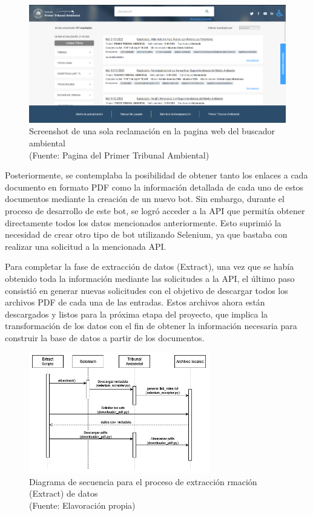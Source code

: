 \begin{figure}[ht!]
    \centering
    \includegraphics[width=.8\textwidth]{figures/huemul2.png}
    \caption[Screenshot de una sola reclamación en la pagina web del buscador ambiental]{Screenshot de una sola reclamación en la pagina web del buscador ambiental\\
    {\scriptsize (Fuente: Pagina del Primer Tribunal Ambiental)}}
    \label{fig:extract2}
\end{figure}
    
Posteriormente, se contemplaba la posibilidad de obtener tanto los enlaces a cada documento en formato PDF como la información 
detallada de cada uno de estos documentos mediante la creación de un nuevo bot. Sin embargo, durante el proceso de desarrollo 
de este bot, se logró acceder a la API que permitía obtener directamente todos los datos mencionados anteriormente. Esto suprimió 
la necesidad de crear otro tipo de bot utilizando Selenium, ya que bastaba con realizar una solicitud a la mencionada API.

Para completar la fase de extracción de datos (Extract), una vez que se había obtenido toda la información mediante las solicitudes 
a la API, el último paso consistió en generar nuevas solicitudes con el objetivo de descargar todos los archivos PDF de cada una 
de las entradas. Estos archivos ahora están descargados y listos para la próxima etapa del proyecto, que implica la transformación 
de los datos con el fin de obtener la información necesaria para construir la base de datos a partir de los documentos.

\begin{figure}[ht!]
    \centering
    \includegraphics[width=0.7\textwidth]{figures/extract_diagram.png}
    \caption[Diagrama de secuencia para el proceso de extracción rmación (Extract) de datos]{Diagrama de secuencia para el proceso de extracción rmación (Extract) de datos\\
    {\scriptsize (Fuente: Elavoración propia)}}
    \label{fig:chatbot1}
\end{figure}



